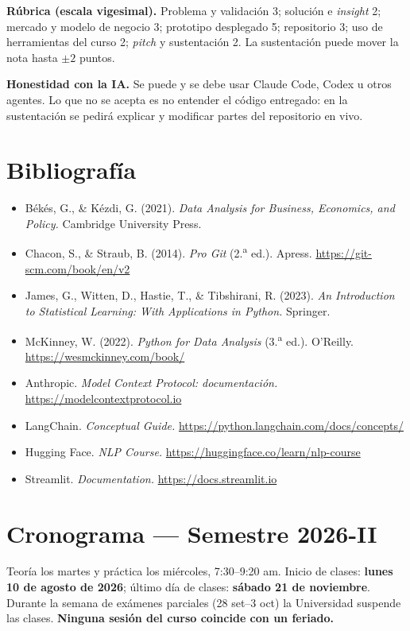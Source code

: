 \documentclass[11pt]{article}
\begin{document}
\textbf{R\'ubrica (escala vigesimal).} Problema y validaci\'on 3; soluci\'on e \emph{insight} 2; mercado y modelo de negocio 3; prototipo desplegado 5; repositorio 3; uso de herramientas del curso 2; \emph{pitch} y sustentaci\'on 2. La sustentaci\'on puede mover la nota hasta $\pm 2$ puntos.

\textbf{Honestidad con la IA.} Se puede y se debe usar Claude Code, Codex u otros agentes. Lo que no se acepta es no entender el c\'odigo entregado: en la sustentaci\'on se pedir\'a explicar y modificar partes del repositorio en vivo.

\section{Bibliograf\'ia}

\begin{itemize}
\item B\'ek\'es, G., \& K\'ezdi, G. (2021). \emph{Data Analysis for Business, Economics, and Policy.} Cambridge University Press.
\item Chacon, S., \& Straub, B. (2014). \emph{Pro Git} (2.\textsuperscript{a} ed.). Apress. \url{https://git-scm.com/book/en/v2}
\item James, G., Witten, D., Hastie, T., \& Tibshirani, R. (2023). \emph{An Introduction to Statistical Learning: With Applications in Python.} Springer.
\item McKinney, W. (2022). \emph{Python for Data Analysis} (3.\textsuperscript{a} ed.). O'Reilly. \url{https://wesmckinney.com/book/}
\item Anthropic. \emph{Model Context Protocol: documentaci\'on.} \url{https://modelcontextprotocol.io}
\item LangChain. \emph{Conceptual Guide.} \url{https://python.langchain.com/docs/concepts/}
\item Hugging Face. \emph{NLP Course.} \url{https://huggingface.co/learn/nlp-course}
\item Streamlit. \emph{Documentation.} \url{https://docs.streamlit.io}
\end{itemize}

\section{Cronograma --- Semestre 2026-II}

Teor\'ia los martes y pr\'actica los mi\'ercoles, 7:30--9:20 am. Inicio de clases: \textbf{lunes 10 de agosto de 2026}; \'ultimo d\'ia de clases: \textbf{s\'abado 21 de noviembre}. Durante la semana de ex\'amenes parciales (28 set--3 oct) la Universidad suspende las clases. \textbf{Ninguna sesi\'on del curso coincide con un feriado.}
\end{document}
